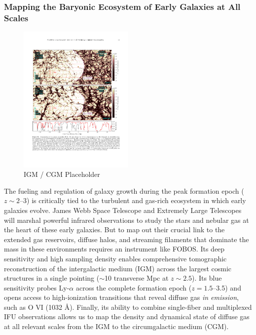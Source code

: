 \documentclass[oneside,11pt]{amsart}
\begin{document}
\subsubsection{Mapping the Baryonic Ecosystem of Early Galaxies at All Scales}
\label{sec:galaxies}


\begin{figure}\small
%
\includegraphics[width=0.5\textwidth]{figs/qso_LightEcho_v1.pdf}
%
\caption{IGM / CGM Placeholder  }
%
\label{fig:M31}
%
\end{figure}

The fueling and regulation of galaxy growth during the peak formation epoch ($z \sim2$--3) is critically tied to the turbulent and gas-rich ecosystem in which early galaxies evolve.  James Webb Space Telescope and Extremely Large Telescopes will marshal powerful infrared observations to study the stars and nebular gas at the heart of these early galaxies.  But to map out their crucial link to the extended gas reservoirs, diffuse halos, and streaming filaments that dominate the mass in these environments requires an instrument like FOBOS.  Its deep sensitivity and high sampling density enables comprehensive tomographic reconstruction of the intergalactic medium (IGM) across the largest cosmic structures in a single pointing ($\sim$10 transverse Mpc at $z \sim 2.5$).  Its blue sensitivity probes Ly-$\alpha$ across the complete formation epoch ($z = 1.5$--3.5) and opens access to high-ionization transitions that reveal diffuse gas \emph{in emission}, such as O VI (1032 \AA).  Finally, its ability to combine single-fiber and multiplexed IFU observations allows us to map the density and dynamical state of diffuse gas at all relevant scales from the IGM to the circumgalactic medium (CGM).
\end{document}
